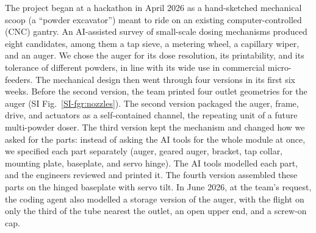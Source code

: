 \documentclass[twoside,twocolumn,9pt]{article}
\newcommand{\siref}[1]{\ref*{SI-#1}}
\begin{document}
The project began at a hackathon in April 2026 as a hand-sketched mechanical scoop (a ``powder excavator'') meant to ride on an existing computer-controlled (CNC) gantry. An AI-assisted survey of small-scale dosing mechanisms\cite{Besenhard2017Micro,Faulhammer2014Dose} produced eight candidates, among them a tap sieve, a metering wheel, a capillary wiper, and an auger. We chose the auger for its dose resolution, its printability, and its tolerance of different powders, in line with its wide use in commercial micro-feeders.\cite{Yang2007Metering,Besenhard2015Accuracy} The mechanical design then went through four versions in its first six weeks. Before the second version, the team printed four outlet geometries for the auger (SI Fig.~\siref{fgr:nozzles}). The second version packaged the auger, frame, drive, and actuators as a self-contained channel, the repeating unit of a future multi-powder doser. The third version kept the mechanism and changed how we asked for the parts: instead of asking the AI tools for the whole module at once, we specified each part separately (auger, geared auger, bracket, tap collar, mounting plate, baseplate, and servo hinge). The AI tools modelled each part, and the engineers reviewed and printed it. The fourth version assembled these parts on the hinged baseplate with servo tilt. In June 2026, at the team's request, the coding agent also modelled a storage version of the auger, with the flight on only the third of the tube nearest the outlet, an open upper end, and a screw-on cap.
\end{document}
